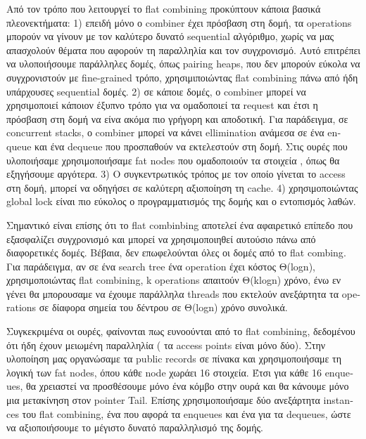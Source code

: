 
Από τον τρόπο που λειτουργεί το \textlatin{flat combining} προκύπτουν κάποια βασικά πλεονεκτήματα:
1) επειδή μόνο ο \textlatin{combiner} έχει πρόσβαση στη δομή, τα \textlatin{operations} μπορούν να γίνουν με τον καλύτερο δυνατό \textlatin{sequential} αλγόριθμο, χωρίς να μας απασχολούν θέματα που αφορούν τη παραλληλία και τον συγχρονισμό. Αυτό επιτρέπει να υλοποιήσουμε παράλληλες δομές, όπως \textlatin{pairing heaps}, που δεν μπορούν εύκολα να συγχρονιστούν με \textlatin{fine-grained} τρόπο, χρησιμιποιώντας \textlatin{flat combining} πάνω από ήδη υπάρχουσες \textlatin{sequential} δομές.
2) σε κάποιε δομές, ο \textlatin{combiner} μπορεί να χρησιμοποιεί κάποιον έξυπνο τρόπο για να ομαδοποιεί τα \textlatin{request} και έτσι η πρόσβαση στη δομή να είνα ακόμα πιο γρήγορη και αποδοτική. Για παράδειγμα, σε \textlatin{concurrent stacks}, ο \textlatin{combiner} μπορεί να κάνει \textlatin{ellimination} ανάμεσα σε ένα \textlatin{enqueue} και ένα \textlatin{dequeue} που προσπαθούν να εκτελεστούν στη δομή. Στις ουρές που υλοποιήσαμε χρησιμοποιήσαμε \textlatin{fat nodes} που ομαδοποιούν τα στοιχεία , όπως θα εξηγήσουμε αργότερα.
3) Ο συγκεντρωτικός τρόπος με τον οποίο γίνεται το \textlatin{access} στη δομή, μπορεί να οδηγήσει σε καλύτερη αξιοποίηση τη \textlatin{cache}.
4) χρησιμοποιώντας \textlatin{global lock} είναι πιο εύκολος ο προγραμματισμός της δομής και ο εντοπισμός λαθών.

Σημαντικό είναι επίσης ότι το \textlatin{flat combinbing} αποτελεί ένα αφαιρετικό επίπεδο που εξασφαλίζει συγχρονισμό και μπορεί να χρησιμοποιηθεί αυτούσιο  πάνω από διαφορετικές δομές. Βέβαια, δεν επωφελούνται όλες οι δομές από το \textlatin{flat combing}. Για παράδειγμα, αν σε ένα \textlatin{search tree} ένα \textlatin{operation} έχει κόστος Θ(\textlatin{logn}), χρησιμοποιώντας \textlatin{flat combining, k} operations απαιτούν Θ(\textlatin{klogn}) χρόνο, ένω εν γένει θα μπορουσαμε να έχουμε παράλληλα \textlatin{threads} που εκτελούν ανεξάρτητα τα \textlatin{operations} σε δίαφορα σημεία του δέντρου σε Θ(\textlatin{logn}) χρόνο συνολικά.

Συγκεκριμένα οι ουρές, φαίνονται πως ευνοούνται από το \textlatin{flat combining}, δεδομένου ότι ήδη έχουν μειωμένη παραλληλία ( τα \textlatin{access points} είναι μόνο δύο). Στην υλοποίηση μας οργανώσαμε τα \textlatin{public records} σε πίνακα και χρησιμοποιήσαμε τη λογική των \textlatin{fat nodes}, όπου κάθε node χωράει 16 στοιχεία. Έτσι για κάθε 16 \textlatin{enqueues}, θα χρειαστεί να προσθέσουμε μόνο ένα κόμβο στην ουρά και θα κάνουμε μόνο μια μετακίνηση στον \textlatin{pointer Tail}. Επίσης χρησιμοποιήσαμε δύο ανεξάρτητα \textlatin{instances} του \textlatin{flat combining}, ένα που αφορά τα \textlatin{enqueues} και ένα για τα \textlatin{dequeues}, ώστε να αξιοποιήσουμε το μέγιστο δυνατό παραλληλισμό της δομής. 
